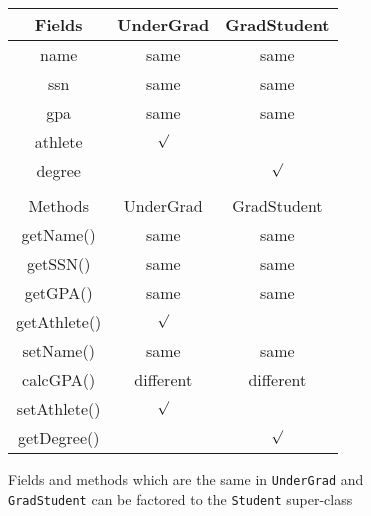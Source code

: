 






\begin {figure}

\begin {tabular} {c | c | c}
Fields		& UnderGrad	& GradStudent			\\
\hline
name		& same		& same 				\\
ssn 		& same		& same 				\\
gpa 		& same		& same 				\\
athlete		& $\surd$	&  				\\
degree		& 		& $\surd$			\\
		&		&				\\
Methods		& UnderGrad	& GradStudent			\\
\hline
getName()	& same		& same 				\\
getSSN()	& same		& same 				\\
getGPA()	& same		& same 				\\
getAthlete()	& $\surd$	&				\\
setName()	& same		& same 				\\
calcGPA()	& different 	& different			\\
setAthlete()	& $\surd$     	& 				\\
getDegree()	&          	& $\surd$ 			
\end {tabular}

\caption {Fields and methods which are the same in 
\texttt{UnderGrad} and \texttt{GradStudent} can be
factored to the \texttt{Student} super-class}

\label {fig:factorStudent}

\end {figure}


